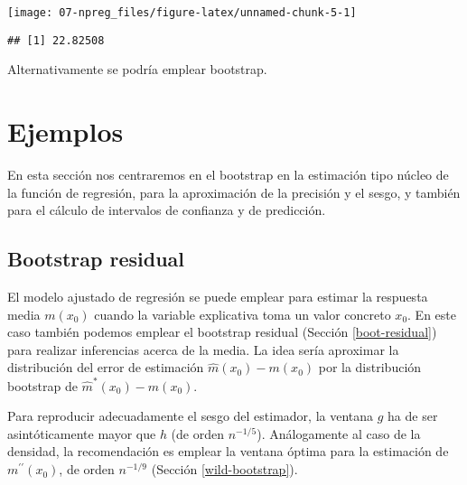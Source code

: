 \documentclass[
]{book}
\newenvironment{Shaded}{\begin{snugshade}}{\end{snugshade}}
\newcommand{\NormalTok}[1]{#1}
\newcommand{\SpecialCharTok}[1]{\textcolor[rgb]{0.00,0.00,0.00}{#1}}
\theoremstyle{break}
\theoremstyle{definition}
\theoremstyle{definition}
\theoremstyle{definition}
\theoremstyle{definition}
\theoremstyle{remark}
\begin{document}
\begin{center}\texttt{[image: 07-npreg\_files/figure-latex/unnamed-chunk-5-1]} \end{center}

\begin{Shaded}
\end{Shaded}

\begin{verbatim}
## [1] 22.82508
\end{verbatim}

Alternativamente se podría emplear bootstrap.

\hypertarget{ejemplos-2}{%
\section{Ejemplos}\label{ejemplos-2}}

En esta sección nos centraremos en el bootstrap en la estimación tipo núcleo de la función de regresión, para la aproximación de la precisión y el sesgo, y también para el cálculo de intervalos de confianza y de predicción.

\hypertarget{bootstrap-residual}{%
\subsection{Bootstrap residual}\label{bootstrap-residual}}

El modelo ajustado de regresión se puede emplear para estimar la respuesta media \(m(x_0)\) cuando la variable explicativa toma un valor concreto \(x_0\).
En este caso también podemos emplear el bootstrap residual (Sección \ref{boot-residual}) para realizar inferencias acerca de la media.
La idea sería aproximar la distribución del error de estimación \(\hat{m}(x_0) - m(x_0)\) por la distribución bootstrap de \(\hat{m}^{\ast}(x_0) - \hat{m}(x_0)\).

Para reproducir adecuadamente el sesgo del estimador, la ventana \(g\) ha de ser asintóticamente mayor que \(h\) (de orden \(n^{-1/5}\)).
Análogamente al caso de la densidad, la recomendación es emplear la ventana óptima para la estimación de \(m^{\prime \prime }\left( x_0 \right)\), de orden \(n^{-1/9}\) (Sección \ref{wild-bootstrap}).
\end{document}
